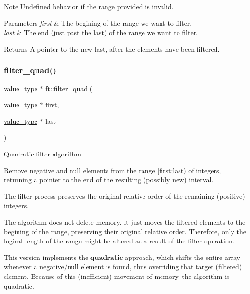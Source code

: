 \begin{DoxyNote}{Note}
Undefined behavior if the range provided is invalid.
\end{DoxyNote}

\begin{DoxyParams}{Parameters}
{\em first} & The begining of the range we want to filter. \\
\hline
{\em last} & The end (just past the last) of the range we want to filter. \\
\hline
\end{DoxyParams}
\begin{DoxyReturn}{Returns}
A pointer to the new last, after the elements have been filtered. 
\end{DoxyReturn}
\mbox{\label{namespaceft_ad44a5fa501d9597c6b2d057a379f4803}} 
\subsubsection{\texorpdfstring{filter\_quad()}{filter\_quad()}}
{\footnotesize\ttfamily \mbox{\hyperlink{namespaceft_a076c091630cdeb4076ec793da6ab56c0}{value\+\_\+type}} $\ast$ ft\+::filter\+\_\+quad (\begin{DoxyParamCaption}\item[{\mbox{\hyperlink{namespaceft_a076c091630cdeb4076ec793da6ab56c0}{value\+\_\+type}} $\ast$}]{first,  }\item[{\mbox{\hyperlink{namespaceft_a076c091630cdeb4076ec793da6ab56c0}{value\+\_\+type}} $\ast$}]{last }\end{DoxyParamCaption})}



Quadratic filter algorithm. 

Remove negative and null elements from the range {\ttfamily \mbox{[}first;last)} of integers, returning a pointer to the end of the resulting (possibly new) interval.

The filter process preserves the original relative order of the remaining (positive) integers.

The algorithm does not delete memory. It just moves the filtered elements to the begining of the range, preserving their original relative order. Therefore, only the logical length of the range might be altered as a result of the filter operation.

This version implements the {\bfseries{quadratic}} approach, which shifts the entire array whenever a negative/null element is found, thus overriding that target (filtered) element. Because of this (inefficient) movement of memory, the algorithm is quadratic.

